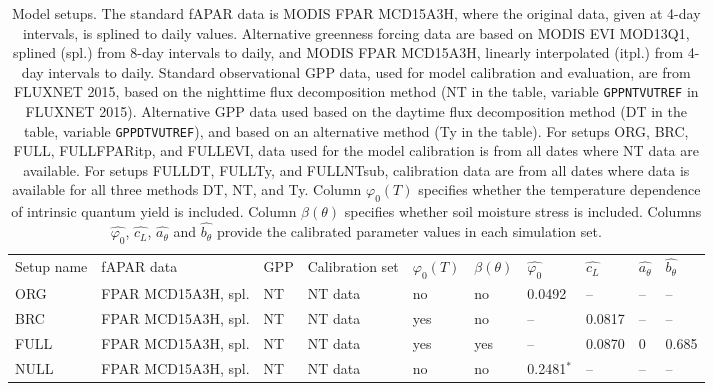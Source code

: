 \documentclass[gmd, manuscript]{copernicus}
\begin{document}
\begin{table}
\caption{Model setups. The standard fAPAR data is MODIS FPAR MCD15A3H, where the original data, given at 4-day intervals, is splined to daily values. Alternative greenness forcing data are based on MODIS EVI MOD13Q1, splined (spl.) from 8-day intervals to daily, and MODIS FPAR MCD15A3H, linearly interpolated (itpl.) from 4-day intervals to daily. Standard observational GPP data, used for model calibration and evaluation, are from FLUXNET 2015, based on the nighttime flux decomposition method (NT in the table, variable \texttt{GPP\textunderscore NT\textunderscore VUT\textunderscore REF} in FLUXNET 2015). Alternative GPP data used based on the daytime flux decomposition method (DT in the table, variable \texttt{GPP\textunderscore DT\textunderscore VUT\textunderscore REF}), and based on an alternative method \citep{wang17natpl} (Ty in the table). For setups ORG, BRC, FULL, FULL\textunderscore FPARitp, and FULL\textunderscore EVI, data used for the model calibration is from all dates where NT data are available. For setups FULL\textunderscore DT, FULL\textunderscore Ty, and FULL\textunderscore NTsub, calibration data are from all dates where data is available for all three methods DT, NT, and Ty. Column $\varphi_0(T)$ specifies whether the temperature dependence of intrinsic quantum yield is included. Column $\beta(\theta )$ specifies whether soil moisture stress is included. Columns $\widehat{\varphi_0}$, $\widehat{c_L}$, $\widehat{a_{\theta}}$ and  $\widehat{b_{\theta}}$ provide the calibrated parameter values in each simulation set.}
\begin{tabular}{llllllllll}
\tophline
    Setup name                 &  fAPAR data              &  GPP      &  Calibration set  &  $\varphi_0(T)$  &  $\beta(\theta )$  &  $\widehat{\varphi_0}$ &  $\widehat{c_L}$    &  $\widehat{a_{\theta}}$  &  $\widehat{b_{\theta}}$   \\
\middlehline
    ORG                        &  FPAR MCD15A3H, spl.     &  NT       &   NT data    &  no         &  no         &  0.0492 &  --     &  -- & --   \\
    BRC                        &  FPAR MCD15A3H, spl.     &  NT       &   NT data    &  yes        &  no         &  --     &  0.0817 &  -- & --   \\
    FULL                       &  FPAR MCD15A3H, spl.     &  NT       &   NT data    &  yes        &  yes        &  --     &  0.0870 &  0  & 0.685 \\
\middlehline
    NULL                       &  FPAR MCD15A3H, spl.     &  NT       &   NT data    &  no         &  no         &  0.2481$^\ast$   &  --     &  --  & -- \\

\end{tabular}
\end{table}
\end{document}
